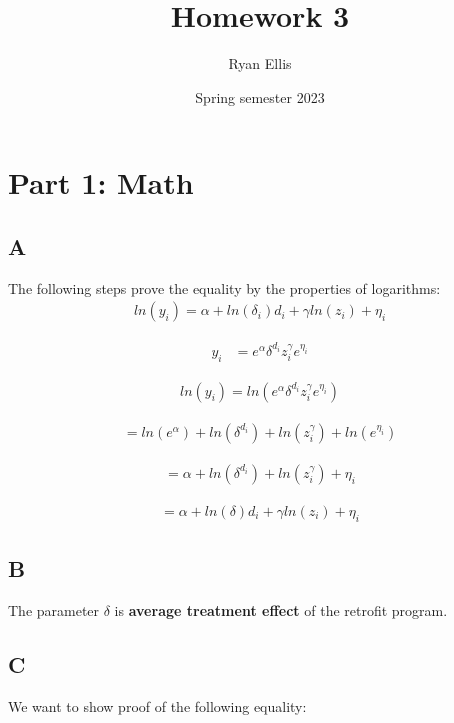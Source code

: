 \documentclass{article}
\title{Homework 3}
\author{Ryan Ellis}
\date{Spring semester 2023}
\begin{document}
  
\maketitle

\section{Part 1: Math}

\subsection{A}
The following steps prove the equality by the properties of logarithms:
\begin{align}
    ln{(y_i)} = \alpha + ln{(\delta_i)} d_i + \gamma ln{(z_i)} + \eta_i
\end{align}

\begin{align}
    y_i &= e^\alpha \delta^{d_i} z^\gamma_i e^{\eta_i}
\end{align}

\begin{align}
    ln{(y_i)} = ln{(e^\alpha \delta^{d_i} z^\gamma_i e^{\eta_i})}
\end{align}

\begin{align}
    = ln{(e^\alpha)} + ln{(\delta^{d_i})} + ln{(z^\gamma_i)} + ln{(e^{\eta_i})}
\end{align}

\begin{align}
    = \alpha + ln{(\delta^{d_i})} + ln{(z^\gamma_i)} + \eta_i
\end{align}

\begin{align}
    = \alpha + ln{(\delta)}d_i + \gamma ln{(z_i)} + \eta_i
\end{align}

\subsection{B}

The parameter $\delta$ is \textbf{average treatment effect} of the retrofit program.

\subsection{C}

We want to show proof of the following equality:
\end{document}
